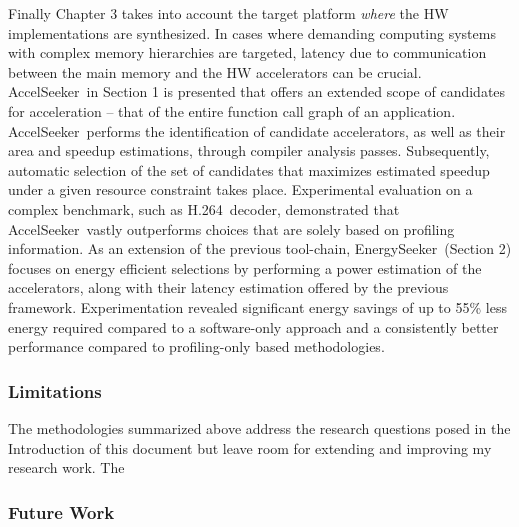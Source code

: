 \documentclass[]{usiinfthesis}
\newcommand{\aseeker}{{AccelSeeker}}
\newcommand{\eseeker}{{EnergySeeker}}
\newcommand{\htsf}{{H.264}}
\begin{document}
Finally Chapter 3 takes into account the target platform {\em where} the HW implementations are synthesized. In cases where demanding computing systems with complex memory hierarchies are 
targeted, latency due to communication between the main memory and the HW accelerators
can be crucial. \aseeker\ in Section 1 is presented that offers an extended scope of candidates for acceleration -- that of the entire function call graph of an application.
\aseeker\ performs the identification of candidate accelerators, as well as their area and speedup estimations, through compiler analysis passes. Subsequently, automatic selection of the set of candidates that maximizes estimated speedup under a given resource constraint takes place. Experimental evaluation on a complex benchmark, such as \htsf\ decoder, demonstrated that 
\aseeker\ vastly outperforms choices that are solely based on profiling information.
As an extension of the previous tool-chain, \eseeker\ (Section 2) focuses on energy efficient selections by performing a power estimation of the accelerators, along with their latency estimation offered by the previous framework. Experimentation revealed significant energy savings of up to 55\% less energy required compared to a software-only approach and a consistently better performance compared to profiling-only based methodologies.\par

\subsubsection{Limitations}

The methodologies summarized above address the research questions posed in the Introduction of this
document but leave room for extending and improving my research work. The 


\subsubsection{Future Work}
\end{document}
